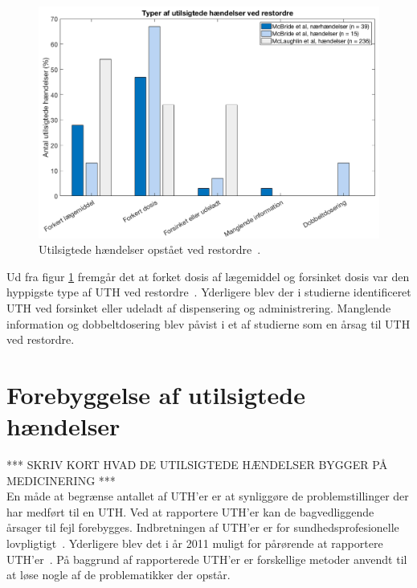\begin{figure}[H]\centering
	\includegraphics[width=1\textwidth]{billeder/UTH2.png} 
	\caption{Utilsigtede hændelser opstået ved restordre~\citep{McLaughlin2013,McBride2013}.}
	\label{fig:UTHrestordre}  
\end{figure}

Ud fra figur \ref{fig:UTHrestordre} fremgår det at forket dosis af lægemiddel og forsinket dosis var den hyppigste type af UTH ved restordre~\citep{McLaughlin2013,McBride2013}. Yderligere blev der i studierne identificeret UTH ved forsinket eller udeladt af dispensering og administrering. Manglende information og dobbeltdosering blev påvist i et af studierne som en årsag til UTH ved restordre.~\citep{McLaughlin2013,McBride2013}

\section{Forebyggelse af utilsigtede hændelser}
*** SKRIV KORT HVAD DE UTILSIGTEDE HÆNDELSER BYGGER PÅ MEDICINERING *** \\
En måde at begrænse antallet af UTH'er er at synliggøre de problemstillinger der har medført til en UTH. Ved at rapportere UTH'er kan de bagvedliggende årsager til fejl forebygges. Indbretningen af UTH'er er for sundhedsprofesionelle lovpligtigt~\citep{Jensen2014}. Yderligere blev det i år 2011 muligt for pårørende at rapportere UTH'er~\citep{Jensen2014}. På baggrund af rapporterede UTH'er er forskellige metoder anvendt til at løse nogle af de problematikker der opstår.

